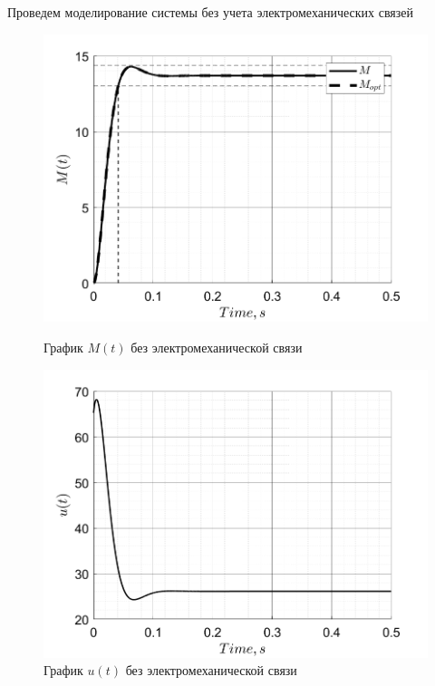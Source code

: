 Проведем моделирование системы без учета электромеханических связей
\begin{figure}[!h]
    \centering
    \begin{minipage}{0.5\textwidth}
        \centering
        \includegraphics[width = \textwidth]{img/task1_M}
        \caption{График $M(t)$ без электромеханической связи}
        \label{fig:img/task1_M}
    \end{minipage}%
\begin{minipage}{0.5\textwidth}
        \centering
        \includegraphics[width = \textwidth]{img/task1_u}
        \caption{График $u(t)$ без электромеханической связи}
        \label{fig:img/task1_u}
    \end{minipage}%
\end{figure}
